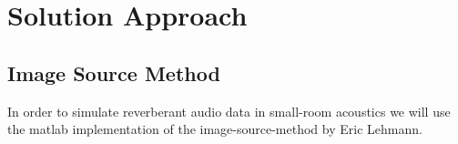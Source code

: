 \chapter{Solution Approach}
\label{chap:approach}

\section{Image Source Method}
In order to simulate reverberant audio data in small-room acoustics we will use the matlab implementation of the image-source-method by Eric Lehmann.\cite{Lehmann}